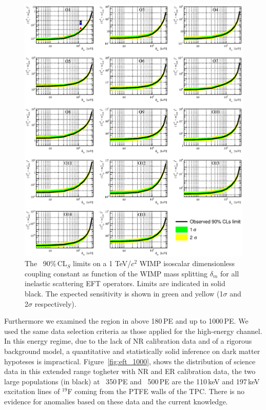 \begin{figure}
\begin{minipage}{1.\linewidth}
\centerline{\includegraphics[width=\textwidth,height=0.99\textheight,keepaspectratio]{Figures/FinalInelastic.eps}}
\end{minipage}
\caption{The \Xehund\ 90\%\,CL$_S$ limits on a 1 TeV/$c^2$ WIMP isoscalar dimensionless coupling constant as function of the WIMP mass splitting $\delta_m$  for all inelastic scattering EFT operators. Limits are indicated in solid black. The expected sensitivity is shown in green and yellow (1$\sigma$ and 2$\sigma$ respectively). }
\label{fig:InelasticLimit}
\end{figure}

Furthermore we examined the region in \cSi{} above 180\,PE and up to 1000\,PE. We used the same data selection criteria as those applied for the high-energy channel. 
In this energy regime, due to the lack of NR calibration data and of a rigorous background model, a quantitative and statistically solid inference on dark
matter hypoteses is impractical. Figure~\ref{fig:eft_1000}, shows the distribution of science data in this extended range togheter with NR and ER calibration data,
the two large populations (in black) at ~350\,PE and ~500\,PE are the 110\,keV and 197\,keV excitation lines of $^{19}$F coming from the PTFE walls of the TPC. 
There is no evidence for anomalies based on these data and the current knowledge.

